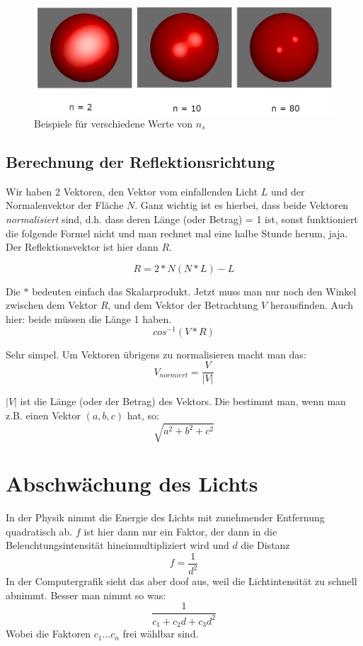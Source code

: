 \begin{figure}[!ht]
	\centering
	\includegraphics[width=0.4\linewidth]{fig/phong_koeffizienten}
	\caption{Beispiele für verschiedene Werte von \(n_s\)}
	\label{fig:phong_koeffizienten}
\end{figure}

\subsection{Berechnung der Reflektionsrichtung}
Wir haben 2 Vektoren, den Vektor vom einfallenden Licht \(L\) und der Normalenvektor der Fläche \(N\). Ganz wichtig ist es hierbei, dass beide Vektoren \textit{normalisiert} sind, d.h. dass deren Länge (oder Betrag) = 1 ist, sonst funktioniert die folgende Formel nicht und man rechnet mal eine halbe Stunde herum, jaja. Der Reflektionsvektor ist hier dann \(R\).

\begin{displaymath}
R = 2*N(N*L) - L
\end{displaymath}

Die \(*\) bedeuten einfach das Skalarprodukt. Jetzt muss man nur noch den Winkel zwischen dem Vektor \(R\), und dem Vektor der Betrachtung \(V\) herausfinden. Auch hier: beide müssen die Länge 1 haben.
\begin{displaymath}
cos^{-1}(V*R)
\end{displaymath}

Sehr simpel. Um Vektoren übrigens zu normalisieren macht man das:
\begin{displaymath}
V_{normiert} = \frac{V}{|V|}
\end{displaymath}

\(|V|\) ist die Länge (oder der Betrag) des Vektors. Die bestimmt man, wenn man z.B. einen Vektor \((a,b,c)\) hat, so:
\begin{displaymath}
\sqrt{a^2+b^2+c^2}
\end{displaymath}
\section{Abschwächung des Lichts}
In der Physik nimmt die Energie des Lichts mit zunehmender Entfernung quadratisch ab. \(f\) ist hier dann nur ein Faktor, der dann in die Beleuchtungsintensität hineinmultipliziert wird und \(d\) die Distanz
\begin{displaymath}
f = \frac{1}{d^2}
\end{displaymath}
In der Computergrafik sieht das aber doof aus, weil die Lichtintensität zu schnell abnimmt. Besser man nimmt so was:
\begin{displaymath}
\frac{1}{c_1+c_2d+c_3d^2}
\end{displaymath}
Wobei die Faktoren \(c_1 \dots c_n\) frei wählbar sind.


